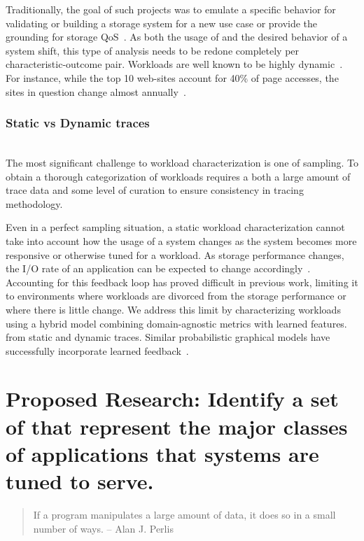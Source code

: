 Traditionally, the goal of such
projects was to emulate a specific behavior for validating or building a
storage system for a new use case or provide the grounding for storage
QoS~\cite{mesnier05}.  As both the usage of and the desired behavior of a system
shift, this type of analysis needs to be redone completely per
characteristic-outcome pair.  Workloads are well known to be highly
dynamic~\cite{uttamchandani2005chameleon}.  For instance, while the top 10 web-sites account for
40\% of page accesses, the sites in question change almost
annually~\cite{avani-systor}.





\subsubsection*{Static vs Dynamic traces}\\ 
The most significant challenge to workload characterization is one of sampling.  To obtain
a thorough categorization of workloads requires a both a large amount of trace
data and some level of curation to ensure consistency in tracing methodology.

Even in a perfect sampling situation, a static workload characterization cannot
take into account how the usage of a system changes as the system becomes more
responsive or otherwise tuned for a workload.  As storage performance changes,
the I/O rate of an application can be expected to change
accordingly~\cite{mesnier05}.  Accounting for this feedback loop has proved
difficult in previous work, limiting it to environments where workloads are
divorced from the storage performance or where there is little change.
We address this limit by characterizing workloads using a hybrid model combining
domain-agnostic metrics with learned features. from static and dynamic traces.  Similar probabilistic
graphical models have successfully incorporate learned
feedback~\cite{liu2012feedback}.  %

\section{Proposed Research: Identify a set of \mWs that represent the major classes of applications that systems are tuned to serve.}
\begin{quote}
If a program manipulates a large amount of data, it does so in a small number of
ways.
-- Alan J. Perlis
\end{quote}

